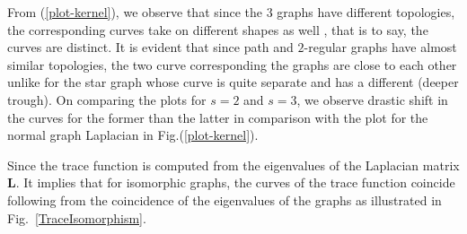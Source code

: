 \documentclass[10pt,a4paper]{article}
\theoremstyle{plain}
\theoremstyle{definition}
\begin{document}
        From (\ref{plot-kernel}), we observe that since the $3$ graphs have different topologies, the corresponding curves take on different shapes as well , that is to say, the curves are distinct. It is evident that since path and $2$-regular graphs have almost similar topologies, the two curve corresponding the graphs are close to each other unlike for the star graph whose  curve is quite separate and has a different (deeper trough). 
        On comparing the plots for $s=2$ and $s=3$, we observe drastic shift in the curves for the former than the latter in comparison with the plot for the normal graph Laplacian in Fig.(\ref{plot-kernel}).
        
        Since the trace function is computed from the eigenvalues of the Laplacian matrix $\mathbf{L}$. It implies that for isomorphic graphs, the curves of the trace function coincide following from the coincidence of the eigenvalues of the graphs as illustrated in Fig.~\ref{TraceIsomorphism}.
\end{document}
